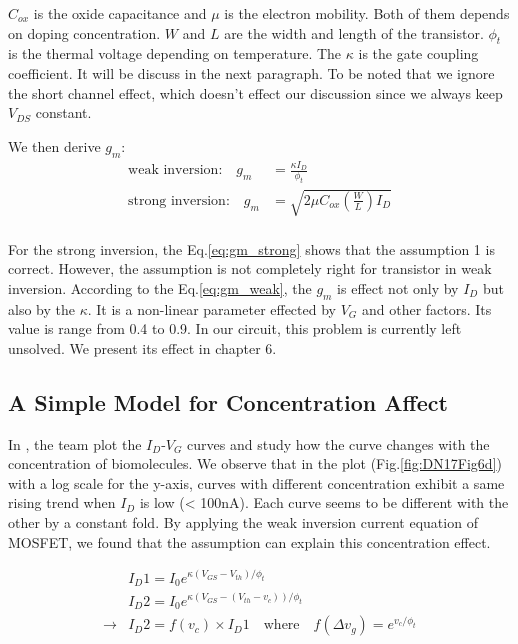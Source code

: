 $C_{ox}$ is the oxide capacitance and $\mu$ is the electron mobility.
Both of them depends on doping concentration.
$W$ and $L$ are the width and length of the transistor.
$\phi_t$ is the thermal voltage depending on temperature.
The $\kappa$ is the gate coupling coefficient.
It will be discuss in the next paragraph.
To be noted that we ignore the short channel effect, which doesn't effect our discussion since we always keep $V_{DS}$ constant.

We then derive $g_m$:
\begin{align}
    \text{weak inversion:} \quad g_m & = \frac{\kappa I_D}{\phi_t}\\ \label{eq:gm_weak}
    \text{strong inversion:} \quad g_m & = \sqrt{2 \mu C_{ox} (\frac{W}{L})I_{D}} \\ \label{eq:gm_strong}
\end{align}

For the strong inversion, the Eq.\ref{eq:gm_strong} shows that the assumption 1 is correct.
However, the assumption is not completely right for transistor in weak inversion.
According to the Eq.\ref{eq:gm_weak}, the $g_m$ is effect not only by $I_D$ but also by the $\kappa$.
It is a non-linear parameter effected by $V_G$ and other factors.
Its value is range from 0.4 to 0.9.
In our circuit, this problem is currently left unsolved.
We present its effect in chapter 6.


\subsection{A Simple Model for Concentration Affect}
In \cite{DN17}, the team plot the $I_D$-$V_G$ curves and study how the curve changes with the concentration of biomolecules.
We observe that in the plot (Fig.\ref{fig:DN17Fig6d}) with a log scale for the y-axis, curves with different concentration exhibit a same rising trend when $I_D$ is low (< 100nA).
Each curve seems to be different with the other by a constant fold.
By applying the weak inversion current equation of MOSFET, we found that the assumption can explain this concentration effect.

\begin{align}
    & I_D1 = I_{0} e^{\kappa(V_{GS} - V_{th}) / \phi_t} \\
    & I_D2 = I_{0} e^{\kappa(V_{GS} - (V_{th} - v_c)) / \phi_t} \\
    \rightarrow & I_D2 = f(v_c) \times I_D1 \quad \text{where} \quad f(\Delta v_g) = e^{v_c / \phi_t} \label{eq:vc}
\end{align}

